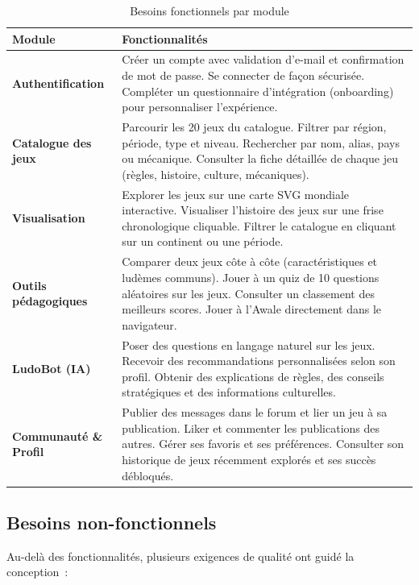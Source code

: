 \begin{table}[H]
\centering
\renewcommand{\arraystretch}{1.4}
\begin{tabularx}{\textwidth}{>{\bfseries}p{3.5cm} X}
\toprule
\textbf{Module} & \textbf{Fonctionnalités} \\
\midrule
Authentification
    & Créer un compte avec validation d'e-mail et confirmation de mot de passe.
      Se connecter de façon sécurisée. Compléter un questionnaire d'intégration (onboarding)
      pour personnaliser l'expérience. \\
\midrule
Catalogue des jeux
    & Parcourir les 20 jeux du catalogue. Filtrer par région, période, type et niveau.
      Rechercher par nom, alias, pays ou mécanique.
      Consulter la fiche détaillée de chaque jeu (règles, histoire, culture, mécaniques). \\
\midrule
Visualisation
    & Explorer les jeux sur une carte SVG mondiale interactive.
      Visualiser l'histoire des jeux sur une frise chronologique cliquable.
      Filtrer le catalogue en cliquant sur un continent ou une période. \\
\midrule
Outils pédagogiques
    & Comparer deux jeux côte à côte (caractéristiques et ludèmes communs).
      Jouer à un quiz de 10 questions aléatoires sur les jeux.
      Consulter un classement des meilleurs scores.
      Jouer à l'Awale directement dans le navigateur. \\
\midrule
LudoBot (IA)
    & Poser des questions en langage naturel sur les jeux.
      Recevoir des recommandations personnalisées selon son profil.
      Obtenir des explications de règles, des conseils stratégiques et des informations
      culturelles. \\
\midrule
Communauté \& Profil
    & Publier des messages dans le forum et lier un jeu à sa publication.
      Liker et commenter les publications des autres.
      Gérer ses favoris et ses préférences.
      Consulter son historique de jeux récemment explorés et ses succès débloqués. \\
\bottomrule
\end{tabularx}
\caption{Besoins fonctionnels par module}
\label{tab:fonctionnels}
\end{table}

\subsection{Besoins non-fonctionnels}

Au-delà des fonctionnalités, plusieurs exigences de qualité ont guidé la conception~:


